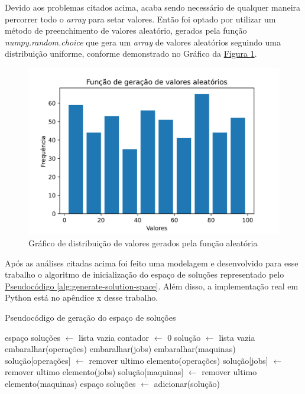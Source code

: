 \noindent Devido aos problemas citados acima, acaba sendo necessário de qualquer maneira percorrer todo o \textit{array} para setar valores. \newline 
Então foi optado por utilizar um método de preenchimento de valores aleatório, 
gerados pela função \textit{numpy.random.choice} que gera um \textit{array} de valores aleatórios seguindo uma distribuição uniforme, 
conforme demonstrado no Gráfico da \hyperref[fig:distrib-uniforme]{Figura \ref{fig:distrib-uniforme}}.

\begin{figure}[ht]
    \centering
    \caption{Gráfico de distribuição de valores gerados pela função aleatória}
    \label{fig:distrib-uniforme}
    \includegraphics[width=\textwidth]{assets/hist_uniform.png}
\end{figure}

%

Após as análises citadas acima foi feito uma modelagem e desenvolvido para esse trabalho o algoritmo de inicialização do espaço de soluções representado pelo 
\hyperref[alg:generate-solution-space]{Pseudocódigo \ref{alg:generate-solution-space}}.
Além disso, a implementação real em Python está no apêndice x desse trabalho.\\
\begin{algorithm}
\caption{Pseudocódigo de geração do espaço de soluções}\label{alg:generate-solution-space}
\begin{algorithmic}
\State espaço soluções $\gets$ lista vazia
\State contador  $\gets$ 0
  \State solução $\gets$ lista vazia
  \State embaralhar(operações)
  \State embaralhar(jobs)
  \State embaralhar(maquinas)
  \State solução[operações] $\gets$ remover ultimo elemento(operações)
  \State solução[jobs] $\gets$ remover ultimo elemento(jobs)
  \State solução[maquinas] $\gets$ remover ultimo elemento(maquinas)
  \State espaço soluções $\gets$ adicionar(solução)
\EndWhile
\end{algorithmic}
\end{algorithm}
